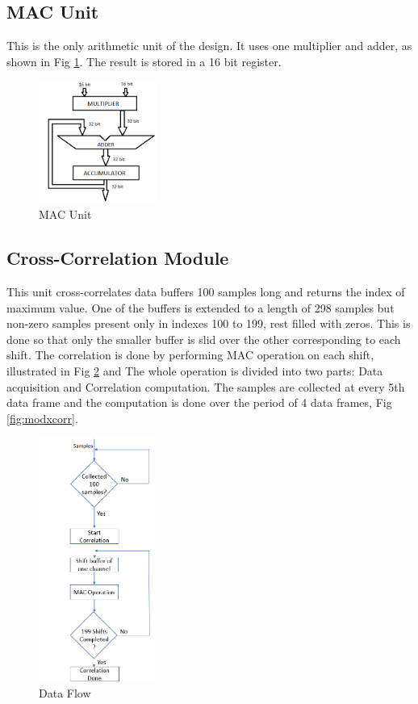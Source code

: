 \documentclass[conference]{IEEEtran}
\begin{document}
\subsection{MAC Unit}
This is the only arithmetic unit of the design. It uses one multiplier and adder, as shown in Fig \ref{fig:mac}. The result is stored in a 16 bit register. 

\begin{figure}
    \centering
    \includegraphics[height = 4cm]{mac.png}
    \caption{MAC Unit}
    \label{fig:mac}
\end{figure}
\subsection{Cross-Correlation Module}
This unit cross-correlates data buffers 100 samples long and returns the index of maximum value. One of the buffers is extended to a length of 298 samples but non-zero samples present only in indexes 100 to 199, rest filled with zeros. This is done so that only the smaller buffer is slid over the other corresponding to each shift. The correlation is done by performing MAC operation on each shift, illustrated in Fig \ref{fig:xcorrflow}  and The whole operation is divided into two parts: Data acquisition and Correlation computation. The samples are collected at every 5th data frame and the computation is done over the period of 4 data frames, Fig \ref{fig:modxcorr}. 

\begin{figure}
    \centering
    \includegraphics[height = 8cm]{xcorr_flow.png}
    \caption{Data Flow}
    \label{fig:xcorrflow}
\end{figure}
\end{document}
